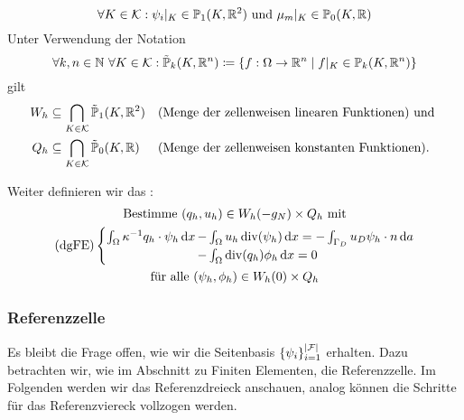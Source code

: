 \begin{remark}
	
	\[	\forall K \in \mathcal{K}:\psi_i|_K \in \mathbb{P}_1(K,\mathbb{R}^2) \text{ und } \mu_m|_K \in \mathbb{P}_0(K,\mathbb{R}) \]
	Unter Verwendung der Notation 
	\[\forall k,n \in  \mathbb{N} \ \forall K \in \mathcal{K}: \tilde{\mathbb{P}}_k(K,\mathbb{R}^n) \coloneqq \left\{  f:\Omega \to \mathbb{R}^n \mid f|_K \in \mathbb{P}_k(K, \mathbb{R}^n)  \right\}  \]
	gilt
	\begin{align*}	
	W_h &\subseteq \bigcap_{K \in \mathcal{K}} \tilde{\mathbb{P}}_1(K,\mathbb{R}^2) &&\text{(Menge der zellenweisen linearen Funktionen) und }\\
	Q_h &\subseteq \bigcap_{K \in \mathcal{K}} \tilde{\mathbb{P}}_0(K,\mathbb{R}) &&\text{(Menge der zellenweisen konstanten Funktionen)}. 
	\end{align*}	
\end{remark}

\begin{define}
	Weiter definieren wir das :
	\begin{gather*}
		\text{Bestimme } (q_h,u_h) \in W_h(-g_N) \times Q_h \text{ mit}\\
		\text{(dgFE)}\begin{cases}
			\int_{\Omega} \kappa ^{-1} q_h \cdot \psi_h \mathop{}\!\mathrm{d} x \mkern-15mu &- \int_{\Omega} u_h \operatorname{div}(\psi_h) \mathop{}\!\mathrm{d} x = - \int_{\Gamma_D} u_D \psi_h \cdot n \mathop{}\!\mathrm{d} a\\
			&- \int_{\Omega} \operatorname{div}(q_h) \phi_h \mathop{}\!\mathrm{d} x = 0
		\end{cases} \\
		\text{für alle } (\psi_h, \phi_h) \in W_h(0) \times Q_h
	\end{gather*}
\end{define}
\subsubsection{Referenzzelle}

Es bleibt die Frage offen, wie wir die Seitenbasis $ \{ \psi_i \}_{i=1}^{\abs{\mathcal{F}}} $ erhalten. Dazu betrachten wir, wie im Abschnitt zu Finiten Elementen, die Referenzzelle. Im Folgenden werden wir das Referenzdreieck anschauen, analog können die Schritte für das Referenzviereck vollzogen werden. 

